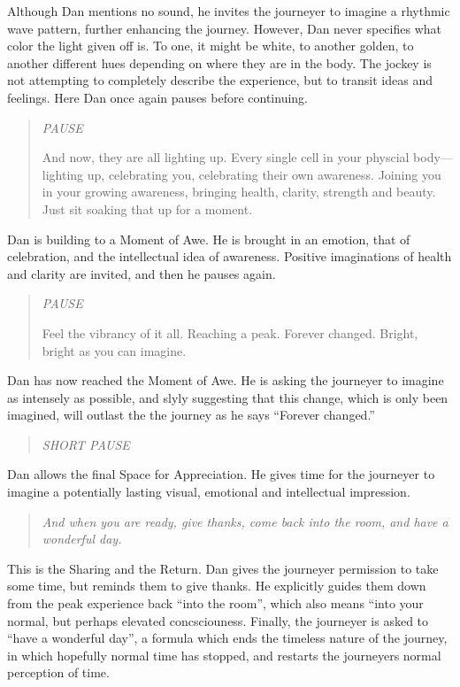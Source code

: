 \documentclass[12pt]{book}
\begin{document}
Although Dan mentions no sound, he invites the journeyer to
imagine a rhythmic wave pattern, further enhancing the journey.
However, Dan never specifies what color the light given off is.
To one, it might be white, to another golden, to another different
hues depending on where they are in the body. The jockey is not
attempting to completely describe the experience, but to
transit ideas and feelings. Here Dan once again pauses before
continuing.

\begin{quote}{\em
  PAUSE



And now, they are all lighting up. Every single cell in your physcial
body---lighting up, celebrating you, celebrating their own awareness.
Joining you in your growing awareness, bringing health, clarity,
strength and beauty. Just sit soaking that up for a moment.
  }\end{quote}

Dan is building to a Moment of Awe. He is brought in an emotion,
that of celebration, and the intellectual idea of awareness.
Positive imaginations of health and clarity are invited,
and then he pauses again.

\begin{quote}{\em
PAUSE

Feel the vibrancy of it all. Reaching a peak. Forever changed.
Bright, bright as you can imagine.
  }\end{quote}

Dan has now reached the Moment of Awe. He is asking the journeyer
to imagine as intensely as possible, and slyly suggesting that this
change, which is only been imagined, will outlast the the journey
as he says ``Forever changed.''

\begin{quote}{\em
  SHORT PAUSE
  }\end{quote}

Dan allows the final Space for Appreciation. He gives time
for the journeyer to imagine a potentially lasting
visual, emotional and intellectual impression.

\begin{quote}{\em
And when you are ready, give thanks, come back into the room,
and have a wonderful day.
}\end{quote}

This is the Sharing and the Return. Dan gives the journeyer
permission to take some time, but reminds them to give thanks.
He explicitly guides them down from the peak experience back
``into the room'', which also means ``into your normal, but
perhaps elevated concsciouness. Finally, the journeyer is
asked to ``have a wonderful day'', a formula which ends
the timeless nature of the journey, in which hopefully
normal time has stopped, and restarts the journeyers normal
perception of time.
\end{document}
